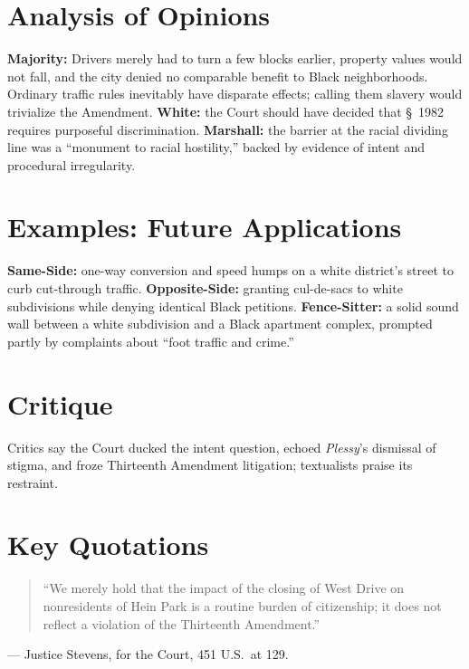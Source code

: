 \documentclass[12pt]{article}
\begin{document}
\section{Analysis of Opinions}
\textbf{Majority:} Drivers merely had to turn a few blocks earlier, property values would not fall, and the city denied no comparable benefit to Black neighborhoods. Ordinary traffic rules inevitably have disparate effects; calling them slavery would trivialize the Amendment. \textbf{White:} the Court should have decided that \S~1982 requires purposeful discrimination. \textbf{Marshall:} the barrier at the racial dividing line was a ``monument to racial hostility,'' backed by evidence of intent and procedural irregularity.

\section{Examples: Future Applications}
\textbf{Same-Side:} one-way conversion and speed humps on a white district's street to curb cut-through traffic. \textbf{Opposite-Side:} granting cul-de-sacs to white subdivisions while denying identical Black petitions. \textbf{Fence-Sitter:} a solid sound wall between a white subdivision and a Black apartment complex, prompted partly by complaints about ``foot traffic and crime.''

\section{Critique}
Critics say the Court ducked the intent question, echoed \textit{Plessy}'s dismissal of stigma, and froze Thirteenth Amendment litigation; textualists praise its restraint.

\section{Key Quotations}
\begin{quote}
``We merely hold that the impact of the closing of West Drive on nonresidents of Hein Park is a routine burden of citizenship; it does not reflect a violation of the Thirteenth Amendment.''
\end{quote}
\noindent --- Justice Stevens, for the Court, 451 U.S.\ at 129.
\end{document}
